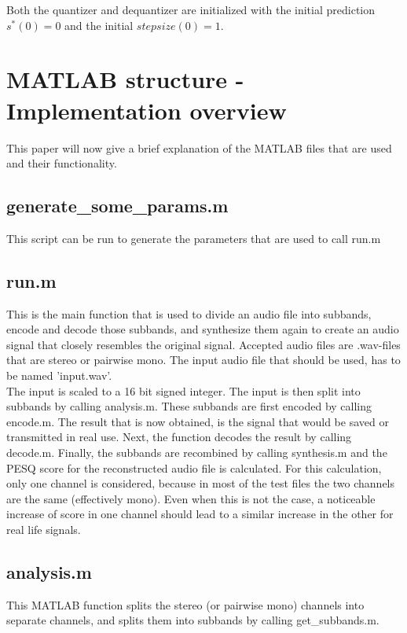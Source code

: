 \documentclass[a4paper]{article}
\begin{document}
Both the quantizer and dequantizer are initialized with the initial prediction $s^*(0) = 0$ and the initial $stepsize(0) = 1$.

\section{MATLAB structure - Implementation overview}
This paper will now give a brief explanation of the MATLAB files that are used and their functionality.

\subsection{generate\_some\_params.m}
This script can be run to generate the parameters that are used to call run.m

\subsection{run.m}
This is the main function that is used to divide an audio file into subbands, encode and decode those subbands, and synthesize them again to create an audio signal that closely resembles the original signal. Accepted audio files are .wav-files that are stereo or pairwise mono. The input audio file that should be used, has to be named 'input.wav'.
\\
The input is scaled to a 16 bit signed integer. The input is then split into subbands by calling analysis.m. These subbands are first encoded by calling encode.m. The result that is now obtained, is the signal that would be saved or transmitted in real use. Next, the function decodes the result by calling decode.m. Finally, the subbands are recombined by calling synthesis.m and the PESQ score for the reconstructed audio file is calculated. For this calculation, only one channel is considered, because in most of the test files the two channels are the same (effectively mono). Even when this is not the case, a noticeable increase of score in one channel should lead to a similar increase in the other for real life signals.

\subsection{analysis.m}
This MATLAB function splits the stereo (or pairwise mono) channels into separate channels, and splits them into subbands by calling get\_subbands.m.
\end{document}
